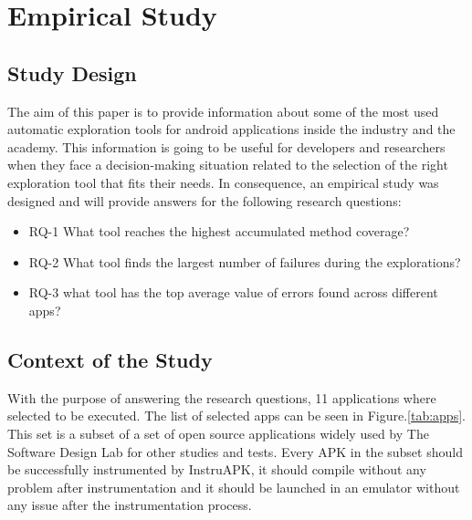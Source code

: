 
\chapter{Empirical Study} %

\label{Chapter4} %

\section{Study Design}\label{sec:studydesign}

The aim of this paper is to provide information about some of the most used automatic exploration tools for android applications inside the industry and the academy. This information is going to be useful for developers and researchers when they face a decision-making situation related to the selection of the right exploration tool that fits their needs. In consequence, an empirical study was designed and will provide answers for the following research questions: 

\begin{itemize}

\item RQ-1 What tool reaches the highest accumulated method coverage?
\item RQ-2 What tool finds the largest number of failures during the explorations?
\item RQ-3 what tool has the top average value of errors found across different apps?
\end{itemize}

\section{Context of the Study}

With the purpose of answering the research questions, 11 applications where selected to be executed. The list of selected apps can be seen in Figure.\ref{tab:apps}. This set is a subset of a set of open source applications widely used by  The Software Design Lab for other studies and tests. Every APK in the subset should be successfully instrumented by InstruAPK, it should compile without any problem after instrumentation and it should be launched in an emulator without any issue after the instrumentation process.


